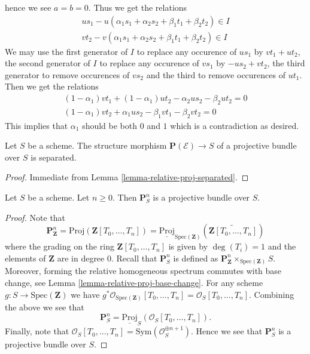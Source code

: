 \begin{example}
hence we see $a = b = 0$. Thus we get the relations
$$
\begin{matrix}
us_1 - u(\alpha_1s_1 + \alpha_2s_2 + \beta_1t_1 + \beta_2t_2)
\in I \\
vt_2 - v(\alpha_1s_1 + \alpha_2s_2 + \beta_1t_1 + \beta_2t_2)
\in I
\end{matrix}
$$
We may use the first generator of $I$ to replace any occurence of
$us_1$ by $vt_1 + ut_2$, the second generator of $I$ to replace any
occurence of $vs_1$ by $-us_2 + vt_2$, the third generator
to remove occurences of $vs_2$ and the third to remove occurences
of $ut_1$. Then we get the relations
$$
\begin{matrix}
(1 - \alpha_1)vt_1 + (1 - \alpha_1)ut_2 - \alpha_2us_2 - \beta_2ut_2 = 0 \\
(1 - \alpha_1)vt_2 + \alpha_1us_2 - \beta_1vt_1 - \beta_2vt_2 = 0
\end{matrix}
$$
This implies that $\alpha_1$ should be both $0$ and $1$ which is
a contradiction as desired.
\end{example}


\begin{lemma}
\label{lemma-projective-bundle-separated}
Let $S$ be a scheme.
The structure morphism $\mathbf{P}(\mathcal{E}) \to S$ of a 
projective bundle over $S$ is separated.
\end{lemma}

\begin{proof}
Immediate from Lemma \ref{lemma-relative-proj-separated}.
\end{proof}

\begin{lemma}
\label{lemma-projective-space-bundle}
Let $S$ be a scheme. Let $n \geq 0$. Then
$\mathbf{P}^n_S$ is a projective bundle over $S$.
\end{lemma}

\begin{proof}
Note that
$$
\mathbf{P}^n_{\mathbf{Z}} =
\text{Proj}(\mathbf{Z}[T_0, \ldots, T_n]) =
\underline{\text{Proj}}_{\text{Spec}(\mathbf{Z})}
\left(\widetilde{\mathbf{Z}[T_0, \ldots, T_n]}\right)
$$
where the grading on the ring $\mathbf{Z}[T_0, \ldots, T_n]$ is given by
$\deg(T_i) = 1$ and the elements of $\mathbf{Z}$ are in degree $0$.
Recall that $\mathbf{P}^n_S$ is defined as
$\mathbf{P}^n_{\mathbf{Z}} \times_{\text{Spec}(\mathbf{Z})} S$.
Moreover, forming the relative homogeneous spectrum commutes with base change,
see Lemma \ref{lemma-relative-proj-base-change}.
For any scheme $g : S \to \text{Spec}(\mathbf{Z})$ we have
$g^*\mathcal{O}_{\text{Spec}(\mathbf{Z})}[T_0, \ldots, T_n]
= \mathcal{O}_S[T_0, \ldots, T_n]$.
Combining the above we see that
$$
\mathbf{P}^n_S = \underline{\text{Proj}}_S(\mathcal{O}_S[T_0, \ldots, T_n]).
$$
Finally, note that
$\mathcal{O}_S[T_0, \ldots, T_n] = \text{Sym}(\mathcal{O}_S^{\oplus n + 1})$.
Hence we see that $\mathbf{P}^n_S$ is a projective bundle over $S$.
\end{proof}







